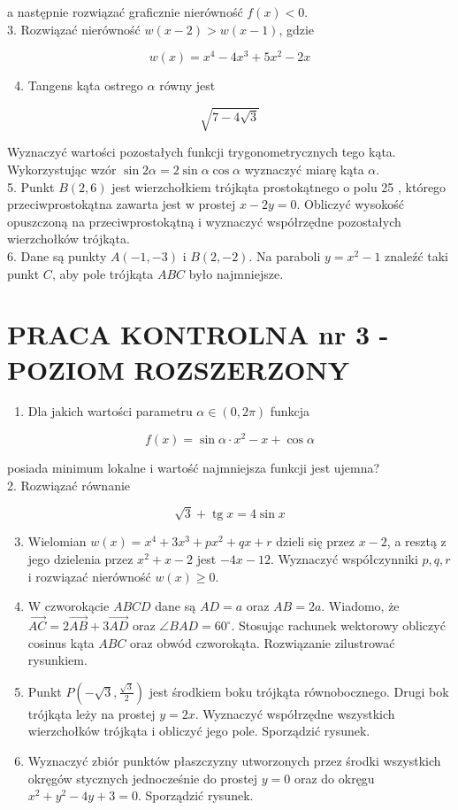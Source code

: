 \documentclass[10pt]{article}
\begin{document}
a następnie rozwiązać graficznie nierówność $f(x)<0$.\\
3. Rozwiązać nierówność $w(x-2)>w(x-1)$, gdzie

$$
w(x)=x^{4}-4 x^{3}+5 x^{2}-2 x
$$

\begin{enumerate}
  \setcounter{enumi}{3}
  \item Tangens kąta ostrego $\alpha$ równy jest
\end{enumerate}

$$
\sqrt{7-4 \sqrt{3}}
$$

Wyznaczyć wartości pozostałych funkcji trygonometrycznych tego kąta. Wykorzystując wzór $\sin 2 \alpha=2 \sin \alpha \cos \alpha$ wyznaczyć miarę kąta $\alpha$.\\
5. Punkt $B(2,6)$ jest wierzchołkiem trójkąta prostokątnego o polu 25 , którego przeciwprostokątna zawarta jest w prostej $x-2 y=0$. Obliczyć wysokość opuszczoną na przeciwprostokątną i wyznaczyć współrzędne pozostałych wierzchołków trójkąta.\\
6. Dane są punkty $A(-1,-3)$ i $B(2,-2)$. Na paraboli $y=x^{2}-1$ znaleźć taki punkt $C$, aby pole trójkąta $A B C$ było najmniejsze.

\section*{PRACA KONTROLNA nr 3 - POZIOM ROZSZERZONY}
\begin{enumerate}
  \item Dla jakich wartości parametru $\alpha \in(0,2 \pi)$ funkcja
\end{enumerate}

$$
f(x)=\sin \alpha \cdot x^{2}-x+\cos \alpha
$$

posiada minimum lokalne i wartość najmniejsza funkcji jest ujemna?\\
2. Rozwiązać równanie

$$
\sqrt{3}+\operatorname{tg} x=4 \sin x
$$

\begin{enumerate}
  \setcounter{enumi}{2}
  \item Wielomian $w(x)=x^{4}+3 x^{3}+p x^{2}+q x+r$ dzieli się przez $x-2$, a resztą z jego dzielenia przez $x^{2}+x-2$ jest $-4 x-12$. Wyznaczyć współczynniki $p, q, r$ i rozwiązać nierówność $w(x) \geqslant 0$.
  \item W czworokącie $A B C D$ dane są $A D=a$ oraz $A B=2 a$. Wiadomo, że $\overrightarrow{A C}=2 \overrightarrow{A B}+3 \overrightarrow{A D}$ oraz $\angle B A D=60^{\circ}$. Stosując rachunek wektorowy obliczyć cosinus kąta $A B C$ oraz obwód czworokąta. Rozwiązanie zilustrować rysunkiem.
  \item Punkt $P\left(-\sqrt{3}, \frac{\sqrt{3}}{2}\right)$ jest środkiem boku trójkąta równobocznego. Drugi bok trójkąta leży na prostej $y=2 x$. Wyznaczyć współrzędne wszystkich wierzchołków trójkąta i obliczyć jego pole. Sporządzić rysunek.
  \item Wyznaczyć zbiór punktów płaszczyzny utworzonych przez środki wszystkich okręgów stycznych jednocześnie do prostej $y=0$ oraz do okręgu $x^{2}+y^{2}-4 y+3=0$. Sporządzić rysunek.
\end{enumerate}
\end{document}
